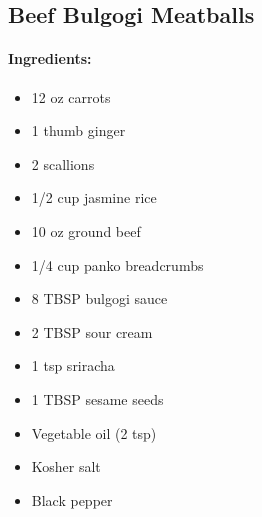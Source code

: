 \documentclass{article}
\begin{document}
\subsection{Beef Bulgogi Meatballs}

\paragraph{Ingredients:}
\begin{itemize}
    \item 12 oz carrots
    \item 1 thumb ginger
    \item 2 scallions
    \item 1/2 cup jasmine rice
    \item 10 oz ground beef
    \item 1/4 cup panko breadcrumbs
    \item 8 TBSP bulgogi sauce
    \item 2 TBSP sour cream
    \item 1 tsp sriracha
    \item 1 TBSP sesame seeds
    \item Vegetable oil (2 tsp)
    \item Kosher salt
    \item Black pepper
\end{itemize}
\end{document}
